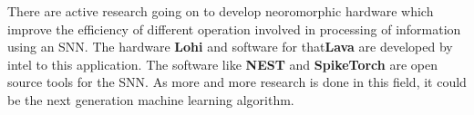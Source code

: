 There are active research going on to develop neoromorphic hardware which
improve the efficiency of different operation involved in processing of
information using an SNN. The hardware \textbf{Lohi}\cite{lohi} and software
for that\textbf{Lava}\cite{lava} are developed by intel to this application.
The software like \textbf{NEST}\cite{nest} and
\textbf{SpikeTorch}\cite{spiketorch} are open source tools for the SNN. As more
and more research is done in this field, it could be the next generation
machine learning algorithm.
